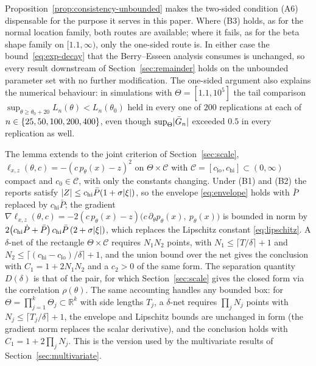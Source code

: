 \begin{remark}
Proposition~\ref{prop:consistency-unbounded} makes the two-sided condition (A6) dispensable for the purpose it serves in this paper. Where (B3) holds, as for the normal location family, both routes are available; where it fails, as for the beta shape family on $[1.1,\infty)$, only the one-sided route is. In either case the bound~\eqref{eq:exp-decay} that the Berry--Esseen analysis consumes is unchanged, so every result downstream of Section~\ref{sec:remainder} holds on the unbounded parameter set with no further modification. The one-sided argument also explains the numerical behaviour: in simulations with $\Theta=[1.1,10^{5}]$ the tail comparison $\sup_{\theta\ge\theta_0+20}L_n(\theta)<L_n(\theta_0)$ held in every one of $200$ replications at each of $n\in\{25,50,100,200,400\}$, even though $\sup_\Theta\lvert\bar G_n\rvert$ exceeded $0.5$ in every replication as well.
\end{remark}

\begin{remark}\label{rem:a6-scale}
The lemma extends to the joint criterion of Section~\ref{sec:scale}, $\ell_{x,z}(\theta,c)=-(c\,p_{\theta}(x)-z)^{2}$ on $\Theta\times\mathcal{C}$ with $\mathcal{C}=[c_{\mathrm{lo}},c_{\mathrm{hi}}]\subset(0,\infty)$ compact and $c_{0}\in\mathcal{C}$, with only the constants changing. Under (B1) and (B2) the reports satisfy $\lvert Z\rvert\le c_{\mathrm{hi}}\bar P(1+\sigma\lvert\xi\rvert)$, so the envelope \eqref{eq:envelope} holds with $\bar P$ replaced by $c_{\mathrm{hi}}\bar P$; the gradient $\nabla\ell_{x,z}(\theta,c)=-2(c\,p_{\theta}(x)-z)\big(c\,\partial_{\theta}p_{\theta}(x),\ p_{\theta}(x)\big)$ is bounded in norm by $2\big(c_{\mathrm{hi}}\dot P+\bar P\big)\,c_{\mathrm{hi}}\bar P\,(2+\sigma\lvert\xi\rvert)$, which replaces the Lipschitz constant \eqref{eq:lipschitz}. A $\delta$-net of the rectangle $\Theta\times\mathcal{C}$ requires $N_{1}N_{2}$ points, with $N_{1}\le\lceil T/\delta\rceil+1$ and $N_{2}\le\lceil(c_{\mathrm{hi}}-c_{\mathrm{lo}})/\delta\rceil+1$, and the union bound over the net gives the conclusion with $C_{1}=1+2N_{1}N_{2}$ and a $c_{2}>0$ of the same form. The separation quantity $D(\delta)$ is that of the pair, for which Section~\ref{sec:scale} gives the closed form via the correlation $\rho(\theta)$. The same accounting handles any bounded box: for $\Theta=\prod_{j=1}^{k}\Theta_{j}\subset\mathbb{R}^{k}$ with side lengths $T_{j}$, a $\delta$-net requires $\prod_{j}N_{j}$ points with $N_{j}\le\lceil T_{j}/\delta\rceil+1$, the envelope and Lipschitz bounds are unchanged in form (the gradient norm replaces the scalar derivative), and the conclusion holds with $C_{1}=1+2\prod_{j}N_{j}$. This is the version used by the multivariate results of Section~\ref{sec:multivariate}.
\end{remark}